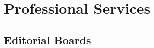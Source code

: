\documentclass[11pt]{article}
\begin{document}



\section{Professional Services}




\subsection{Editorial Boards}
\end{document}
